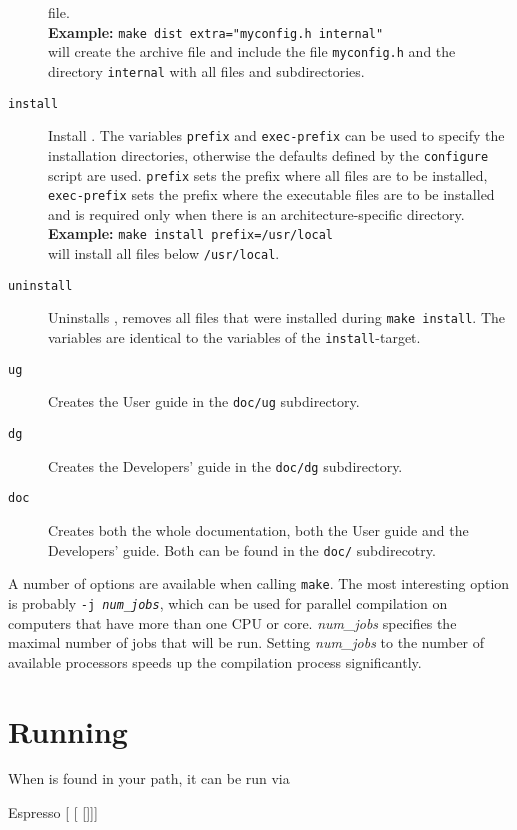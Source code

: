 \begin{description}
  file. \\
  \textbf{Example:} \verb!make dist extra="myconfig.h internal"!\\
  will create the archive file and include the file
  \texttt{myconfig.h} and the directory \texttt{internal} with all
  files and subdirectories.
\item[\texttt{install}] Install \es. The variables \texttt{prefix} and
  \texttt{exec-prefix} can be used to specify the installation
  directories, otherwise the defaults defined by the
  \texttt{configure} script are used. \texttt{prefix} sets the prefix
  where all \es files are to be installed, \texttt{exec-prefix} sets
  the prefix where the executable files are to be installed and is
  required only when there is an architecture-specific directory.\\
  \textbf{Example:} \verb!make install prefix=/usr/local!\\
  will install all files below \texttt{/usr/local}.
\item[\texttt{uninstall}] Uninstalls \es, \ie removes all files that
  were installed during \texttt{make install}. The variables are
  identical to the variables of the \texttt{install}-target.
\item[\texttt{ug\ \ }] Creates the User guide in the \texttt{doc/ug}
  subdirectory.
\item[\texttt{dg\ \ }] Creates the Developers' guide in the \texttt{doc/dg}
  subdirectory.
\item[\texttt{doc\ }] Creates both the whole documentation, \ie both the
  User guide and the Developers' guide. Both can be found in the \texttt{doc/}
  subdirecotry.
\end{description}

A number of options are available when calling \texttt{make}.  The
most interesting option is probably \texttt{-j \textit{num\_jobs}},
which can be used for parallel compilation on computers that have more
than one CPU or core.  \textit{num\_jobs} specifies the maximal number
of jobs that will be run.  Setting \textit{num\_jobs} to the number of
available processors speeds up the compilation process significantly.

\section{Running \es}
\label{sec:run}

When \es is found in your path, it can be run via
\begin{code}
Espresso [ [ []]]
\end{code}

